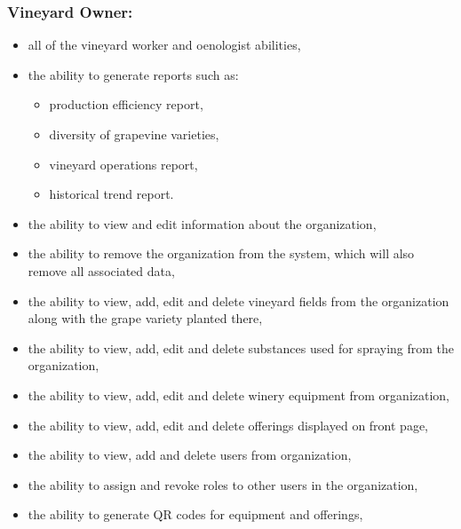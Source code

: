 \subsubsection{Vineyard Owner:}
\begin{itemize}
	\item all of the vineyard worker and oenologist abilities,
	\item the ability to generate reports such as:
	\begin{itemize}
		\item production efficiency report,
		\item diversity of grapevine varieties,
		\item vineyard operations report,
		\item historical trend report.
	\end{itemize}
	\item the ability to view and edit information about the organization,
	\item the ability to remove the organization from the system, which will also remove all associated data,
	\item the ability to view, add, edit and delete vineyard fields from the organization along with the grape variety planted there,
	\item the ability to view, add, edit and delete substances used for spraying from the organization,
	\item the ability to view, add, edit and delete winery equipment from organization,
	\item the ability to view, add, edit and delete offerings displayed on front page,
	\item the ability to view, add and delete users from organization,
	\item the ability to assign and revoke roles to other users in the organization,
	\item the ability to generate QR codes for equipment and offerings,
\end{itemize}
